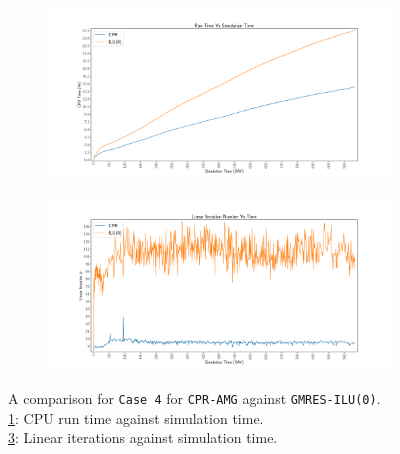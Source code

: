 \begin{figure}
\centering
\begin{subfigure}[b]{\textwidth}
   \includegraphics[width=1\linewidth]{figures/case8/cpu_time.pdf}
   \caption{}
   \label{case4_cpu}
\end{subfigure}

\begin{subfigure}[b]{\textwidth}
   \includegraphics[width=1\linewidth]{figures/case8/its_time.pdf}
   \caption{}
   \label{case4_its}
\end{subfigure}

\caption[caption]{A comparison for \texttt{Case 4} for \texttt{CPR-AMG} against \texttt{GMRES-ILU(0)}.\\\hspace{\textwidth}
	\cref{case4_cpu}: CPU run time against simulation time. \\\hspace{\textwidth}
	\cref{case4_its}: Linear iterations against simulation time.\\\hspace{\textwidth}}
\end{figure}

